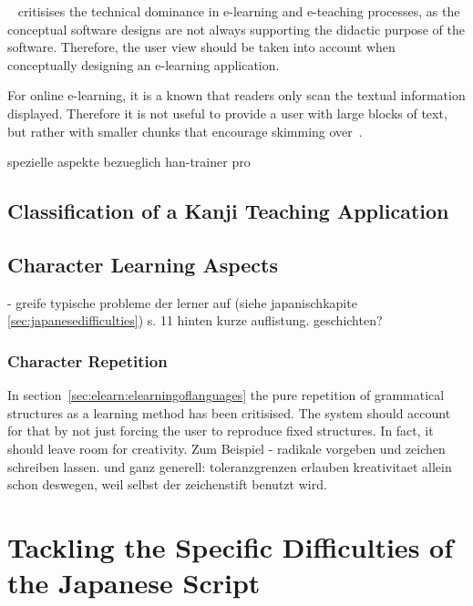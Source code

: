 ~\citeyear{Ivashin2009} critisises the technical 
dominance in e-learning and e-teaching processes, as the conceptual software
designs are not always supporting the didactic purpose of the software.
Therefore, the user view should be taken into account when conceptually designing
an e-learning application.

For online e-learning, it is a known that readers only scan the textual 
information displayed. Therefore it is not useful to provide a user with 
large blocks of text, but rather with smaller chunks that encourage 
skimming over~.

 spezielle aspekte bezueglich han-trainer pro

\subsection{Classification of a Kanji Teaching Application}
\label{sec:concept:classificationofakanjiteachingapplication}


\subsection{Character Learning Aspects}
\label{sec:concept:charaterlearningaspects}


- greife typische probleme der lerner auf 
  (siehe japanischkapite \ref{sec:japanesedifficulties})
  s. 11 hinten kurze auflistung. geschichten?


\subsubsection{Character Repetition}
\label{sec:concept:characterrepetition} %

In section~\ref{sec:elearn:elearningoflanguages} the pure repetition of 
grammatical structures as a learning method has been critisised.
The system should account for that by not just forcing the user to
reproduce fixed structures. In fact, it should leave room for creativity.
Zum Beispiel - radikale vorgeben und zeichen schreiben lassen.
und ganz generell: toleranzgrenzen erlauben kreativitaet allein schon deswegen,
weil selbst der zeichenstift benutzt wird.



\section{Tackling the Specific Difficulties of the Japanese Script}
\label{sec:concept:tacklingdifficulties}

